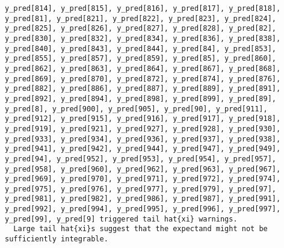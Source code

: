 \documentclass[
  letterpaper,
  DIV=11,
  numbers=noendperiod]{scrartcl}
\begin{document}
\begin{verbatim}
y_pred[814], y_pred[815], y_pred[816], y_pred[817], y_pred[818],
y_pred[81], y_pred[821], y_pred[822], y_pred[823], y_pred[824],
y_pred[825], y_pred[826], y_pred[827], y_pred[828], y_pred[82],
y_pred[830], y_pred[832], y_pred[834], y_pred[836], y_pred[838],
y_pred[840], y_pred[843], y_pred[844], y_pred[84], y_pred[853],
y_pred[855], y_pred[857], y_pred[859], y_pred[85], y_pred[860],
y_pred[862], y_pred[863], y_pred[864], y_pred[867], y_pred[868],
y_pred[869], y_pred[870], y_pred[872], y_pred[874], y_pred[876],
y_pred[882], y_pred[886], y_pred[887], y_pred[889], y_pred[891],
y_pred[892], y_pred[894], y_pred[898], y_pred[899], y_pred[89],
y_pred[8], y_pred[900], y_pred[905], y_pred[90], y_pred[911],
y_pred[912], y_pred[915], y_pred[916], y_pred[917], y_pred[918],
y_pred[919], y_pred[921], y_pred[927], y_pred[928], y_pred[930],
y_pred[933], y_pred[934], y_pred[936], y_pred[937], y_pred[938],
y_pred[941], y_pred[942], y_pred[944], y_pred[947], y_pred[949],
y_pred[94], y_pred[952], y_pred[953], y_pred[954], y_pred[957],
y_pred[958], y_pred[960], y_pred[962], y_pred[963], y_pred[967],
y_pred[969], y_pred[970], y_pred[971], y_pred[972], y_pred[974],
y_pred[975], y_pred[976], y_pred[977], y_pred[979], y_pred[97],
y_pred[981], y_pred[982], y_pred[986], y_pred[987], y_pred[991],
y_pred[992], y_pred[994], y_pred[995], y_pred[996], y_pred[997],
y_pred[99], y_pred[9] triggered tail hat{xi} warnings.
  Large tail hat{xi}s suggest that the expectand might not be
sufficiently integrable.
 

\end{verbatim}
\end{document}
